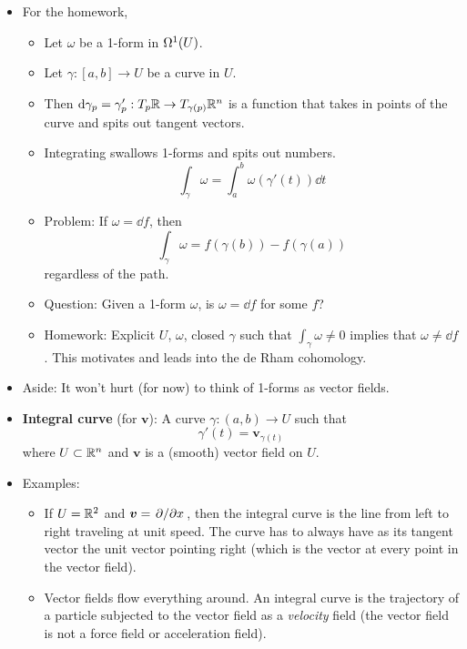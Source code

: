 \documentclass[../notes.tex]{subfiles}
\begin{document}
\begin{itemize}
\begin{itemize}
\begin{enumerate}
        \end{enumerate}
    \end{itemize}
    \item For the homework,
    \begin{itemize}
        \item Let $\omega$ be a 1-form in $\ome[1]{U}$.
        \item Let $\gamma:[a,b]\to U$ be a curve in $U$.
        \item Then $\dd{\gamma_p}=\gamma_p':T_p\R\to T_{\gamma(p)}\R^n$ is a function that takes in points of the curve and spits out tangent vectors.
        \item Integrating swallows 1-forms and spits out numbers.
        \begin{equation*}
            \int_\gamma\omega = \int_a^b\omega(\gamma'(t))\dd{t}
        \end{equation*}
        \item Problem: If $\omega=\dd{f}$, then
        \begin{equation*}
            \int_\gamma\omega = f(\gamma(b))-f(\gamma(a))
        \end{equation*}
        regardless of the path.
        \item Question: Given a 1-form $\omega$, is $\omega=\dd{f}$ for some $f$?
        \item Homework: Explicit $U$, $\omega$, closed $\gamma$ such that $\int_\gamma\omega\neq 0$ implies that $\omega\neq\dd{f}$. This motivates and leads into the de Rham cohomology.
    \end{itemize}
    \item Aside: It won't hurt (for now) to think of 1-forms as vector fields.
    \item \textbf{Integral curve} (for $\bm{v}$): A curve $\gamma:(a,b)\to U$ such that
    \begin{equation*}
        \gamma'(t) = \bm{v}_{\gamma(t)}
    \end{equation*}
    where $U\subset\R^n$ and $\bm{v}$ is a (smooth) vector field on $U$.
    \item Examples:
    \begin{itemize}
        \item If $U=\R^2$ and $\bm{v}=\pdv*{x}$, then the integral curve is the line from left to right traveling at unit speed. The curve has to always have as its tangent vector the unit vector pointing right (which is the vector at every point in the vector field).
        \item Vector fields flow everything around. An integral curve is the trajectory of a particle subjected to the vector field as a \emph{velocity} field (the vector field is not a force field or acceleration field).

\end{itemize}
\end{itemize}
\end{document}

